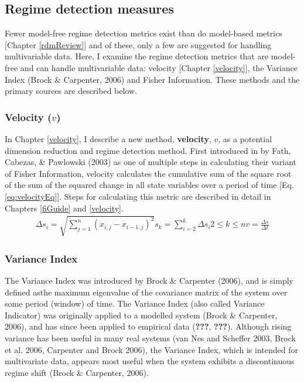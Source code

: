 \documentclass[12pt,twoside,openany]{reedthesis}
\begin{document}
\subsection{Regime detection measures}\label{regime-detection-measures}

Fewer model-free regime detection metrics exist than do model-based
metrics {[}Chapter \ref{rdmReview}{]} and of these, only a few are
suggested for handling multivariable data. Here, I examine the regime
detection metrics that are model-free and can handle multivariable data:
velocity {[}Chapter \ref{velocity}{]}, the Variance Index (Brock \&
Carpenter, 2006) and Fisher Information. These methods and the primary
sources are described below.

\subsubsection{\texorpdfstring{Velocity
(\(v\))}{Velocity (v)}}\label{velocity-v}

In Chapter \ref{velocity}, I describe a new method, \textbf{velocity},
\(v\), as a potential dimension reduction and regime detection method.
First introduced in by Fath, Cabezas, \& Pawlowski (2003) as one of
multiple steps in calculating their variant of Fisher Information,
velocity calculates the cumulative sum of the square root of the sum of
the squared change in all state variables over a period of time {[}Eq.
\eqref{eq:velocityEq}{]}. Steps for calculating this metric are described
in detail in Chapters \ref{fiGuide} and \ref{velocity}.
\begin{equation}
\begin{array}{rcr}
\Delta s_i = \sqrt{\sum_{j=1}^{n} (x_{i,j} -x_{i-1, j})^2}
s_k =  \sum_{i=2}^{k}\Delta{s_i}
2\leq k \leq n
v =\frac{\Delta s}{\Delta t}  
\end{array}
\label{eq:velocityEq}
\end{equation}
\subsubsection{Variance Index}\label{variance-index}

The Variance Index was introduced by Brock \& Carpenter (2006), and is
simply defined asthe maximum eigenvalue of the covariance matrix of the
system over some period (window) of time. The Variance Index (also
called Variance Indicator) was originally applied to a modelled system
(Brock \& Carpenter, 2006), and has since been applied to empirical data
({\textbf{???}}, {\textbf{???}}). Although rising variance has been
useful in many real systems (van Nes and Scheffer 2003, Brock et al.
2006, Carpenter and Brock 2006), the Variance Index, which is intended
for multivariate data, appears most useful when the system exhibits a
discontinuous regime shift (Brock \& Carpenter, 2006).
\end{document}
